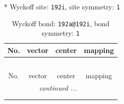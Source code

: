 \documentclass[fleqn,8pt]{jsarticle}
\begin{document}
* Wyckoff site: {\tt 192i}, site symmetry: {\tt 1}
\renewcommand{\arraystretch}{1.2}
\begin{longtable}{cccc}
\caption{Wyckoff bond: {\tt 192a@192i}, bond symmetry: {\tt 1}}
 \\
 \hline \hline
No. & vector & center & mapping \\ \hline \endfirsthead

\multicolumn{3}{l}{\tablename\ \thetable{}} \\
 \hline \hline
No. & vector & center & mapping \\ \hline \endhead

 \hline \hline
\multicolumn{3}{r}{\footnotesize\it continued ...} \\ \endfoot

 \hline \hline
\multicolumn{3}{r}{} \\ \endlastfoot


\end{longtable}
\end{document}
